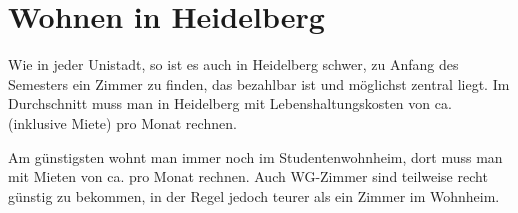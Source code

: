 \section{Wohnen in Heidelberg}



Wie in jeder Unistadt, so ist es auch in Heidelberg schwer, zu Anfang des Semesters
ein Zimmer zu finden, das bezahlbar ist und möglichst zentral liegt. Im Durchschnitt
muss man in Heidelberg mit Lebenshaltungskosten von ca.  (inklusive Miete)
pro Monat rechnen.

Am günstigsten wohnt man immer noch im Studentenwohnheim, dort muss man mit Mieten
von ca.  pro Monat rechnen. Auch WG-Zimmer sind teilweise recht
günstig zu bekommen, in der Regel jedoch teurer als ein Zimmer im Wohnheim.

